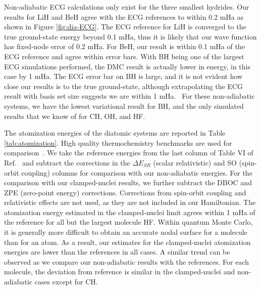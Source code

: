 \documentclass[pra,superscriptaddress,groupedaddress,twocolumn]{revtex4-1}
\begin{document}
Non-adiabatic ECG calculations only exist for the three smallest hydrides. Our results for LiH and BeH agree with the ECG references to within 0.2 mHa as shown in Figure \ref{fig:dia-ECG}. The ECG reference for LiH is converged to the true ground-state energy beyond 0.1 mHa, thus it is likely that our wave function has fixed-node error of 0.2 mHa. For BeH, our result is within 0.1 mHa of the ECG reference and agree within error bars. With BH being one of the largest ECG simulations performed, the DMC result is actually lower in energy, in this case by 1 mHa. The ECG error bar on BH is large, and it is not evident how close our results is to the true ground-state, although extrapolating the ECG result with basis set size suggests we are within 1 mHa.~\cite{Bubin_BeH_noBO} For these non-adiabatic systems, we have the lowest variational result for BH, and the only simulated results that we know of for CH, OH, and HF.

The atomization energies of the diatomic systems are reported in Table \ref{tab:atomization}. High quality thermochemistry benchmarks are used for comparison~\cite{Feller_Corrections}. We take the reference energies from the last column of Table VI of Ref.~\cite{Feller_Corrections} and subtract the corrections in the $\Delta E_{SR}$ (scalar relativistic) and SO (spin-orbit coupling) columns for comparison with our non-adiabatic energies. For the comparison with our clamped-nuclei results, we further subtract the DBOC and ZPE (zero-point energy) corrections. Corrections from spin-orbit coupling and relativistic effects are not used, as they are not included in our Hamiltonian. The atomization energy estimated in the clamped-nuclei limit agrees within 1 mHa of the reference for all but the largest molecule HF. %
Within quantum Monte Carlo, it is generally more difficult to obtain an accurate nodal surface for a molecule than for an atom. As a result, our estimates for the clamped-nuclei atomization energies are lower than the references in all cases. A similar trend can be observed as we compare our non-adiabatic results with the references. For each molecule, the deviation from reference is similar in the clamped-nuclei and non-adiabatic cases except for CH.
\end{document}
